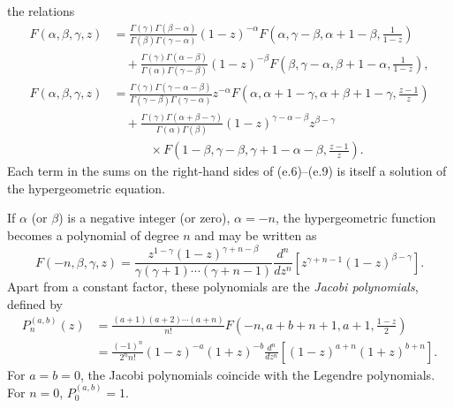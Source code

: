the relations
\begin{equation}
 \begin{split}
 F(\alpha,\beta,\gamma,z)
 &=\frac{\Gamma(\gamma)\Gamma(\beta-\alpha)}
 {\Gamma(\beta)\Gamma(\gamma-\alpha)}(1-z)^{-\alpha}
 F\left(\alpha,\gamma-\beta,\alpha+1-\beta,\frac1{1-z}\right)\\
 &\hspace{1em}+\frac{\Gamma(\gamma)\Gamma(\alpha-\beta)}
 {\Gamma(\alpha)\Gamma(\gamma-\beta)}(1-z)^{-\beta}
 F\left(\beta,\gamma-\alpha,\beta+1-\alpha,\frac1{1-z}\right),
 \end{split}
 \tag{e.8}
\end{equation}
\begin{equation}
 \begin{split}
 F(\alpha,\beta,\gamma,z)
 &=\frac{\Gamma(\gamma)\Gamma(\gamma-\alpha-\beta)}
 {\Gamma(\gamma-\beta)\Gamma(\gamma-\alpha)}z^{-\alpha}
 F\left(\alpha,\alpha+1-\gamma,\alpha+\beta+1-\gamma,
 \frac{z-1}{z}\right)\\
 &\hspace{1em}+\frac{\Gamma(\gamma)\Gamma(\alpha+\beta-\gamma)}
 {\Gamma(\alpha)\Gamma(\beta)}(1-z)^{\gamma-\alpha-\beta}z^{\beta-\gamma}\\
 &\hspace{3em}\times
 F\left(1-\beta,\gamma-\beta,\gamma+1-\alpha-\beta,
 \frac{z-1}{z}\right).
 \end{split}
 \tag{e.9}
\end{equation}
Each term in the sums on the right-hand sides of (e.6)--(e.9) is itself a
solution of the hypergeometric equation.

If $\alpha$ (or $\beta$) is a negative integer (or zero), $\alpha=-n$, the
hypergeometric function becomes a polynomial of degree $n$ and may be written
as
\begin{equation}
 F(-n,\beta,\gamma,z)=
 \frac{z^{1-\gamma}(1-z)^{\gamma+n-\beta}}
 {\gamma(\gamma+1)\cdots(\gamma+n-1)}
 \frac{d^n}{dz^n}\left[z^{\gamma+n-1}(1-z)^{\beta-\gamma}\right].
 \tag{e.10}
\end{equation}
Apart from a constant factor, these polynomials are the \emph{Jacobi
polynomials}, defined by
\begin{equation}
 \begin{split}
 P_n^{(a,b)}(z)
 &=\frac{(a+1)(a+2)\cdots(a+n)}{n!}
 F\left(-n,a+b+n+1,a+1,\frac{1-z}{2}\right)\\
 &=\frac{(-1)^n}{2^nn!}(1-z)^{-a}(1+z)^{-b}
 \frac{d^n}{dz^n}\left[(1-z)^{a+n}(1+z)^{b+n}\right].
 \end{split}
 \tag{e.11}
\end{equation}
For $a=b=0$, the Jacobi polynomials coincide with the Legendre polynomials.
For $n=0$, $P_0^{(a,b)}=1$.
